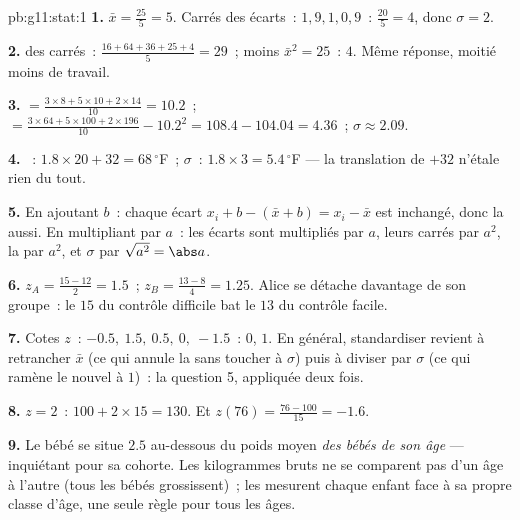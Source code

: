 \begin{solution}{pb:g11:stat:1}
\textbf{1.}  $\bar x = \frac{25}{5} = 5$. Carrés des
écarts~: $1, 9, 1, 0, 9$~:  $\frac{20}{5} = 4$, donc
$\sigma = 2$.

\textbf{2.}  des carrés~:
$\frac{16 + 64 + 36 + 25 + 4}{5} = 29$~; moins
$\bar x^2 = 25$~:  $4$. Même réponse, moitié moins de
travail.

\textbf{3.}  $= \frac{3 \times 8 + 5 \times 10 + 2 \times
14}{10} = 10.2$~;  $= \frac{3 \times 64 + 5 \times 100 +
2 \times 196}{10} - 10.2^2 = 108.4 - 104.04 = 4.36$~;
$\sigma \approx 2.09$.

\textbf{4.} ~: $1.8 \times 20 + 32 = 68\,^\circ$F~;
$\sigma$~: $1.8 \times 3 = 5.4\,^\circ$F --- la translation de
$+32$ n'étale rien du tout.

\textbf{5.} En ajoutant $b$~: chaque écart
$x_i + b - (\bar x + b) = x_i - \bar x$ est inchangé, donc la
 aussi. En multipliant par $a$~: les écarts sont multipliés
par $a$, leurs carrés par $a^2$, la  par $a^2$, et $\sigma$
par $\sqrt{a^2} = \abs a$.

\textbf{6.} $z_A = \frac{15 - 12}{2} = 1.5$~;
$z_B = \frac{13 - 8}{4} = 1.25$. Alice se détache davantage de son
groupe~: le $15$ du contrôle difficile bat le $13$ du contrôle
facile.

\textbf{7.} Cotes $z$~: $-0.5,\ 1.5,\ 0.5,\ 0,\ -1.5$~: 
$0$,  $1$. En général, standardiser revient à retrancher
$\bar x$ (ce qui annule la  sans toucher à $\sigma$) puis à
diviser par $\sigma$ (ce qui ramène le nouvel  à $1$)~: la
question 5, appliquée deux fois.

\textbf{8.} $z = 2$~: $100 + 2 \times 15 = 130$. Et
$z(76) = \frac{76 - 100}{15} = -1.6$.

\textbf{9.} Le bébé se situe $2.5$  au-dessous du poids
moyen \emph{des bébés de son âge} --- inquiétant pour sa cohorte.
Les kilogrammes bruts ne se comparent pas d'un âge à l'autre (tous
les bébés grossissent)~; les  mesurent chaque enfant face à
sa propre classe d'âge, une seule règle pour tous les âges.


\end{solution}
